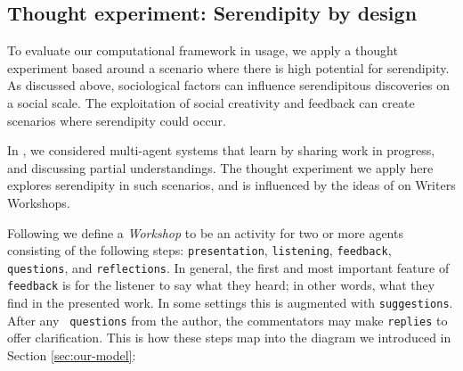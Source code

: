 \subsection{Thought experiment:  Serendipity by design} \label{sec:ww}

To evaluate our computational framework in usage, we apply a thought
experiment based around a scenario where there is high potential for
serendipity.  As discussed above, sociological factors can influence
serendipitous discoveries on a social scale.  The exploitation of
social creativity and feedback can create scenarios where serendipity
could occur.

In \cite{poetry-workshop}, we considered multi-agent systems that
learn by sharing work in progress, and discussing partial
understandings.  The thought experiment we apply here explores
serendipity in such scenarios, and is influenced by the ideas of
 on Writers Workshops.

Following 
we define a \emph{Workshop} to be an activity for two or more agents
consisting of the following steps:
{\tt presentation}, {\tt listening}, {\tt feedback}, {\tt questions},
and {\tt reflections}.  In general, the first and most important
feature of {\tt feedback} is for the listener to say what they heard;
in other words, what they find in the presented work.  In some
settings this is augmented with {\tt suggestions}.  After any {\tt
  questions} from the author, the commentators may make {\tt replies}
to offer clarification.
This is how these steps map into the diagram we introduced in Section \ref{sec:our-model}:


